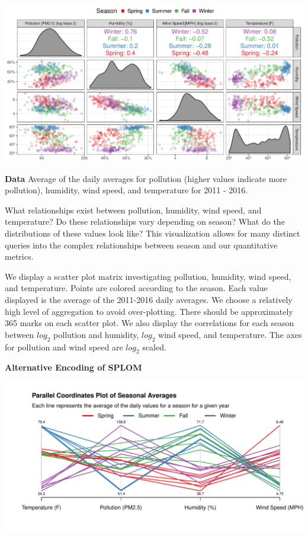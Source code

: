 \documentclass[landscape]{article}
\begin{document}
\begin{center}\includegraphics{RoughSketches_files/figure-latex/unnamed-chunk-3-1} \end{center}

\textbf{Data} Average of the daily averages for pollution (higher values
indicate more pollution), humidity, wind speed, and temperature for 2011
- 2016.

What relationships exist between pollution, humidity, wind speed, and
temperature? Do these relationships vary depending on season? What do
the distributions of these values look like? This visualization allows
for many distinct queries into the complex relationships between season
and our quantitative metrics.

We display a scatter plot matrix investigating pollution, humidity, wind
speed, and temperature. Points are colored according to the season. Each
value displayed is the average of the 2011-2016 daily averages. We
choose a relatively high level of aggregation to avoid over-plotting.
There should be approximately 365 marks on each scatter plot. We also
display the correlations for each season between \(log_2\) pollution and
humidity, \(log_2\) wind speed, and temperature. The axes for pollution
and wind speed are \(log_2\) scaled.

\newpage

\textbf{Alternative Encoding of SPLOM}

\begin{center}\includegraphics{RoughSketches_files/figure-latex/unnamed-chunk-4-1} \end{center}
\end{document}
